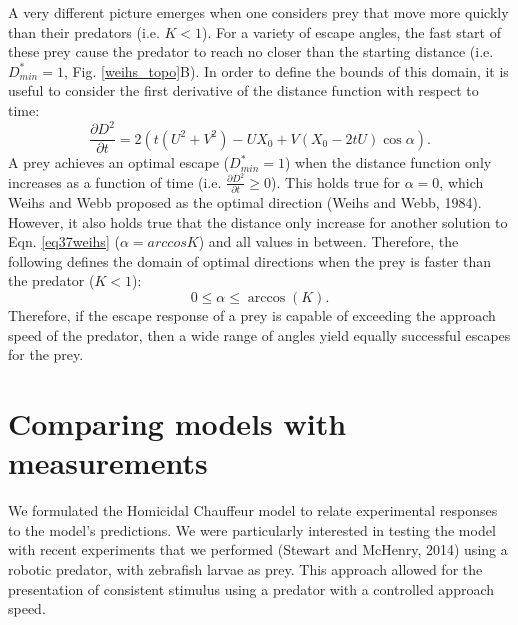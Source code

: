 \documentclass[12pt]{article}
\def\d{\partial}
\begin{document}
A very different picture emerges when one considers prey that move more quickly than their predators (i.e. $K<1$). For a variety of escape angles, the fast start of these prey cause the predator to reach no closer than the starting distance (i.e. $D_{min}^*=1$, Fig. \ref{weihs_topo}B). In order to define the bounds of this domain, it is useful to consider the first derivative of the distance function with respect to time:
%
\begin{equation}
\frac{\d D^2}{\d t}= 2(t(U^2+V^2) - UX_0 + V(X_0-2tU)\cos\alpha).
\label{distderivative}
\end{equation}  
%
A prey achieves an optimal escape ($D_{min}^*=1$) when the distance function only increases as a function of time (i.e. $\frac{\d D^2}{\d t}\geq0$). This holds true for $\alpha=0$, which Weihs and Webb proposed as the optimal direction (Weihs and Webb, 1984). However, it also holds true that the distance only increase for another solution to Eqn. \ref{eq37weihs} ($\alpha=arccos K$) and all values in between. Therefore, the following defines the domain of optimal directions when the prey is faster than the predator ($K<1$):
%
\begin{equation}
0 \leq \alpha \leq \arccos(K).
\label{anglerange}
\end{equation}
%
Therefore, if the escape response of a prey is capable of exceeding the approach speed of the predator, then a wide range of angles yield equally successful escapes for the prey.


\section{Comparing models with measurements}

We formulated the Homicidal Chauffeur model to relate experimental responses to the model's predictions. We were particularly interested in testing the model with recent experiments that we performed (Stewart and McHenry, 2014) using a robotic predator, with zebrafish larvae as prey. This approach allowed for the presentation of consistent stimulus using a predator with a controlled approach speed. 
\end{document}
